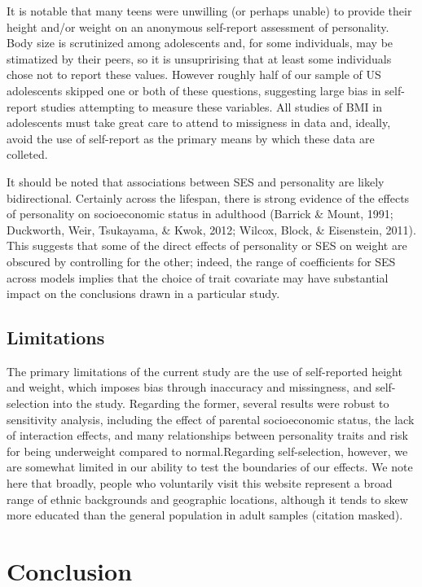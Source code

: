 \documentclass[man]{apa6}
\begin{document}
It is notable that many teens were unwilling (or perhaps unable) to provide their height and/or weight on an anonymous self-report assessment of personality. Body size is scrutinized among adolescents and, for some individuals, may be stimatized by their peers, so it is unsuprirising that at least some individuals chose not to report these values. However roughly half of our sample of US adolescents skipped one or both of these questions, suggesting large bias in self-report studies attempting to measure these variables. All studies of BMI in adolescents must take great care to attend to missigness in data and, ideally, avoid the use of self-report as the primary means by which these data are colleted.

It should be noted that associations between SES and personality are likely bidirectional. Certainly across the lifespan, there is strong evidence of the effects of personality on socioeconomic status in adulthood (Barrick \& Mount, 1991; Duckworth, Weir, Tsukayama, \& Kwok, 2012; Wilcox, Block, \& Eisenstein, 2011). This suggests that some of the direct effects of personality or SES on weight are obscured by controlling for the other; indeed, the range of coefficients for SES across models implies that the choice of trait covariate may have substantial impact on the conclusions drawn in a particular study.

\hypertarget{limitations}{%
\subsection{Limitations}\label{limitations}}

The primary limitations of the current study are the use of self-reported height and weight, which imposes bias through inaccuracy and missingness, and self-selection into the study. Regarding the former, several results were robust to sensitivity analysis, including the effect of parental socioeconomic status, the lack of interaction effects, and many relationships between personality traits and risk for being underweight compared to normal.Regarding self-selection, however, we are somewhat limited in our ability to test the boundaries of our effects. We note here that broadly, people who voluntarily visit this website represent a broad range of ethnic backgrounds and geographic locations, although it tends to skew more educated than the general population in adult samples (citation masked).

\hypertarget{conclusion}{%
\section{Conclusion}\label{conclusion}}
\end{document}
